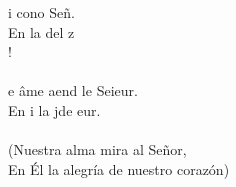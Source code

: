 \begin{cancion}%
	i cono Señ.  \\
	En  la del z\\
	!   \\
	\jump\\
	e âme aend le Seieur.\\
	En i la jde eur.\\
	\jump\\
(Nuestra alma mira al Señor,\\
En Él la alegría de nuestro corazón)\\
\end{cancion}%
